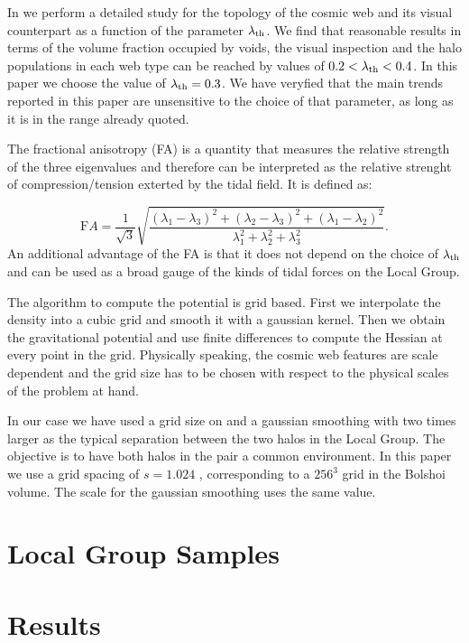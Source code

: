 \documentclass{emulateapj}
\newcommand{\hMpc}{{\ifmmode{h^{-1}{\rm Mpc}}\else{$h^{-1}$Mpc }\fi}}
\begin{document}
In \cite{Tweb} we perform a detailed study for the topology of the
cosmic web and its visual counterpart as a function of the parameter
$\lambda_{\rm th}$. We find that reasonable results in terms of the
volume fraction occupied by voids, the visual inspection and the halo
populations in each web type can be reached by values of $0.2<\lambda_{\rm
th}<0.4$. In this paper we choose the value of $\lambda_{\rm
  th}=0.3$. We have veryfied that the main trends reported in this
paper are unsensitive to the choice of that parameter, as long as it
is in the range already quoted.


The fractional anisotropy (FA) \citep{Libeskind2013} is a quantity
that measures the relative strength of the three eigenvalues and
therefore can be interpreted as the relative strenght of
compression/tension exterted by the tidal field. It is defined as:

\begin{equation}
{\mathrm FA}=\frac{1}{\sqrt{3}}\sqrt{\frac{(\lambda_1- \lambda_3)^2 + (\lambda_2 - \lambda_3)^2 + (\lambda_1 - \lambda_2)^2}{\lambda_1^2+\lambda_2^2 + \lambda_3^2}}.
\end{equation}
%
An additional advantage of the FA is that it does not depend on the
choice of $\lambda_{\rm th}$ and can be used as a broad gauge of the
kinds of tidal forces on the Local Group.


The algorithm to compute the potential is grid based. First we
interpolate the density into a cubic grid and smooth it with a
gaussian kernel. Then we obtain the gravitational potential and use
finite differences to compute the Hessian at every point in the
grid. Physically speaking, the cosmic web features are scale
dependent and the grid size has to be chosen with respect to the
physical scales of the problem at hand.

In our case we have used a grid size on and a gaussian smoothing with
two times larger as the typical separation between the two
halos in the Local Group. The objective is to have both halos in the
pair a common environment. In this paper we use a grid spacing of
$s=1.024$ \hMpc, corresponding to a $256^3$ grid in the Bolshoi
volume. The scale for the gaussian smoothing uses the same value.


\section{Local Group Samples}



\section{Results}
\label{sec:results}
\end{document}
